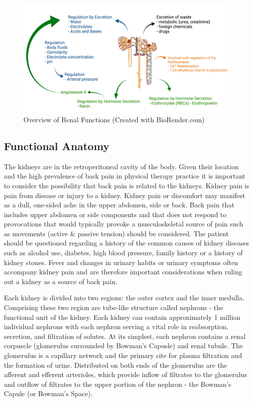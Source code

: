 \begin{figure}[!h]
    \centering
    \includegraphics[width=1.0\linewidth]{./figure/Renal_Functions.png}
    \caption{Overview of Renal Functions \footnotesize{(Created with BioRender.com)}}
    \label{fig:Renal_Functions}
\end{figure}

\subsection{Functional Anatomy}

The kidneys are in the retroperitoneal cavity of the body.  Given their location and the high prevalence of back pain in physical therapy practice it is important to consider the possibility that back pain is related to the kidneys. Kidney pain is pain from disease or injury to a kidney. Kidney pain or discomfort may manifest as a dull, one-sided ache in the upper abdomen, side or back. Back pain that includes upper abdomen or side components and that does not respond to provocations that would typically provoke a musculoskeletal source of pain such as movements (active \& passive tension) should be considered. The patient should be questioned regarding a history of the common causes of kidney diseases such as alcohol use, diabetes, high blood pressure, family history or a history of kidney stones. Fever and changes in urinary habits or urinary symptoms often accompany kidney pain and are therefore important considerations when ruling out a kidney as a source of back pain.


Each kidney is divided into two regions: the outer cortex and the inner medulla. Comprising these two region are tube-like structure called nephrons - the functional unit of the kidney. Each kidney can contain approximately 1 million individual nephrons with each nephron serving a vital role in reabsorption, secretion, and filtration of solutes. At its simplest, each nephron contains a renal corpuscle (glomerulus surrounded by Bowman’s Capusle) and renal tubule. The glomerulus is a capillary network and the primary site for plasma filtration and the formation of urine. Distributed on both ends of the glomerulus are the afferent and efferent arterioles, which provide inflow of filtrates to the glomerulus and outflow of filtrates to the upper portion of the nephron - the Bowman’s Capule (or Bowman’s Space).

